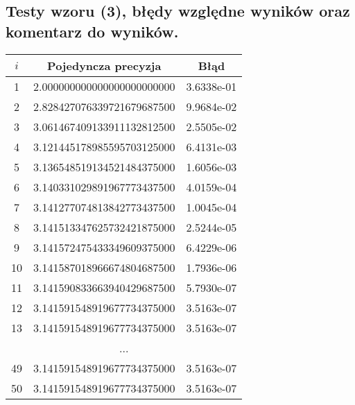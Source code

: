 \documentclass[10pt,wide]{mwart}
\theoremstyle{definition}
\begin{document}
\subsection{Testy wzoru (3), błędy względne wyników oraz komentarz do wyników.}
\begin{minipage}[t]{0.5\textwidth}

  \begin{tabular}{|c|c|c|} \hline
    \(i\) & Pojedyncza precyzja & Błąd \\ \hline
    1 & 2.000000000000000000000000 & 3.6338e-01 \\ \hline
    2 & 2.828427076339721679687500 & 9.9684e-02 \\ \hline
    3 & 3.061467409133911132812500 & 2.5505e-02 \\ \hline
    4 & 3.121445178985595703125000 & 6.4131e-03 \\ \hline
    5 & 3.136548519134521484375000 & 1.6056e-03 \\ \hline
    6 & 3.140331029891967773437500 & 4.0159e-04 \\ \hline
    7 & 3.141277074813842773437500 & 1.0045e-04 \\ \hline
    8 & 3.141513347625732421875000 & 2.5244e-05 \\ \hline
    9 & 3.141572475433349609375000 & 6.4229e-06 \\ \hline
    10 & 3.141587018966674804687500 & 1.7936e-06 \\ \hline
    11 & 3.141590833663940429687500 & 5.7930e-07 \\ \hline
    12 & 3.141591548919677734375000 & 3.5163e-07 \\ \hline
    13 & 3.141591548919677734375000 & 3.5163e-07 \\ \hline
    \multicolumn{3}{|c|}{...} \\ \hline
    49 & 3.141591548919677734375000 & 3.5163e-07 \\ \hline
    50 & 3.141591548919677734375000 & 3.5163e-07 \\ \hline
  \end{tabular}
\end{minipage}
\end{document}
